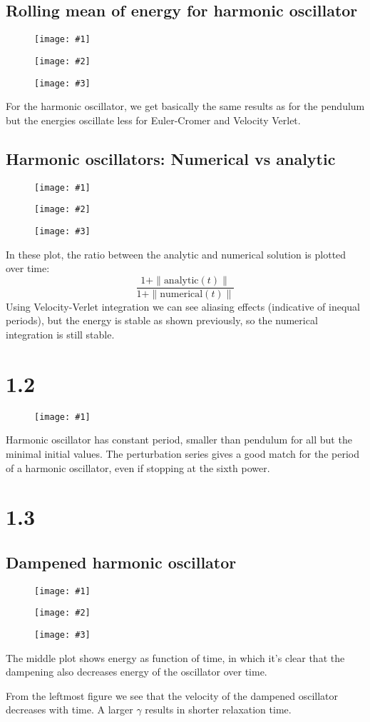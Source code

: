 \documentclass[11pt]{article}
\newcommand{\triplefigure}[3]{
\begin{figure}[H]
  \centering
  \begin{minipage}{0.3\textwidth}
    \centering
    \texttt{[image: \#1]}
  \end{minipage}
  \begin{minipage}{0.3\textwidth}
    \centering
    \texttt{[image: \#2]}
  \end{minipage}
  \begin{minipage}{0.3\textwidth}
    \centering
    \texttt{[image: \#3]}
  \end{minipage}
\end{figure}
}
\newcommand{\singlefigure}[1]{
\begin{figure}[H]
  \centering
  \begin{minipage}{0.4\textwidth}
    \centering
    \texttt{[image: \#1]}
  \end{minipage}
\end{figure}
}
\begin{document}
\subsection*{Rolling mean of energy for harmonic oscillator}
\triplefigure{./plots/1_1/rollingMean_harmonic_1.png}{./plots/1_1/rollingMean_harmonic_2.png}{./plots/1_1/rollingMean_harmonic_3.png}
For the harmonic oscillator, we get basically the same results as for the pendulum but the energies oscillate less for Euler-Cromer and Velocity Verlet.

\subsection*{Harmonic oscillators: Numerical vs analytic}
\triplefigure{./plots/1_1/comparison_numanalytic_1.png}{./plots/1_1/comparison_numanalytic_2.png}{./plots/1_1/comparison_numanalytic_3.png}
In these plot, the ratio between the analytic and numerical solution is plotted over time:
$$
\frac{1 + \|\text{analytic}(t)\|}{1 + \|\text{numerical}(t)\|}
$$
Using Velocity-Verlet integration we can see aliasing effects (indicative of inequal periods), but the energy is stable as shown previously, so the numerical integration is still stable.

\section*{1.2}
\singlefigure{./plots/1_2/period.png}
Harmonic oscillator has constant period, smaller than pendulum for all but the minimal initial values.
The perturbation series gives a good match for the period of a harmonic oscillator, even if stopping at the sixth power.

\section*{1.3}

\subsection*{Dampened harmonic oscillator}
\triplefigure{./plots/1_3/dampened_dx.png}{./plots/1_3/dampened_E.png}{./plots/1_3/dampened_x.png}
The middle plot shows energy as function of time, in which it's clear that the dampening also decreases energy of the oscillator over time.

From the leftmost figure we see that the velocity of the dampened oscillator decreases with time. A larger $\gamma$ results in shorter relaxation time.
\end{document}

